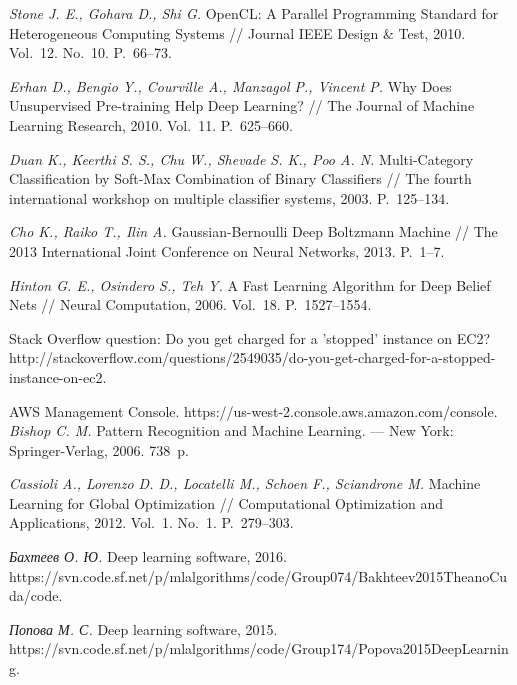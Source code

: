 \documentclass[12pt]{article}
\begin{document}
\begin{thebibliography}{10}
\emph{Stone  J. E.,   Gohara D.,  Shi G.}
OpenCL: A Parallel Programming Standard for Heterogeneous Computing Systems
// Journal IEEE Design \& Test, 2010. Vol.~12. No.~10. P.~66--73.

\emph{Erhan D.,
Bengio Y.,
Courville A.,
Manzagol P.,
Vincent P.}
Why Does Unsupervised Pre-training Help Deep Learning? // The Journal of Machine Learning Research, 2010. Vol.~11. P.~625--660.


\emph{ Duan K., Keerthi S. S., Chu W.,  Shevade S. K., Poo A. N.}
Multi-Category Classification by Soft-Max
Combination of Binary Classifiers // The
fourth international workshop on multiple classifier systems, 2003. P.~125--134.


\emph{Cho K.,  Raiko T.,  Ilin A.}
Gaussian-Bernoulli Deep Boltzmann Machine // The 2013 International Joint Conference on Neural Networks, 2013. P.~1--7.

\emph{Hinton G. E.,  Osindero S., Teh Y.}
A Fast Learning Algorithm for Deep Belief Nets // Neural Computation, 2006. Vol.~18. P.~1527--1554.

Stack Overflow question: Do you get charged for a 'stopped' instance on EC2? http://stackoverflow.com/questions/2549035/do-you-get-charged-for-a-stopped-instance-on-ec2.

%
AWS Management Console. https://us-west-2.console.aws.amazon.com/console.
%
\emph{Bishop C. M.}
Pattern Recognition and Machine Learning. --- New York: Springer-Verlag, 2006. 738~p.


\emph{Cassioli A., Lorenzo D. D., Locatelli M., Schoen F., Sciandrone M.}
Machine Learning for Global Optimization // Computational Optimization and Applications, 2012. Vol.~1. No.~1. P.~279--303.

%
\emph{Бахтеев О. Ю.} Deep learning software, 2016.
https://svn.code.sf.net/p/mlalgorithms/code/Group074/Bakhteev2015TheanoCuda/code.


\emph{Попова М. С.} Deep learning software, 2015.
https://svn.code.sf.net/p/mlalgorithms/code/Group174/Popova2015DeepLearning.
\end{thebibliography}
\end{document}
